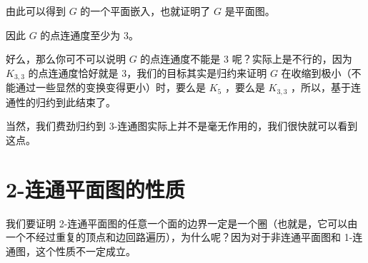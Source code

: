 \documentclass[11pt, a4paper]{ctexart}
\begin{document}
由此可以得到 $G$ 的一个平面嵌入，也就证明了 $G$ 是平面图。

因此 $G$ 的点连通度至少为 3。

好么，那么你可不可以说明 $G$ 的点连通度不能是 3 呢？实际上是不行的，因为 $K_{3,3}$ 的点连通度恰好就是 3，我们的目标其实是归约来证明 $G$ 在收缩到极小（不能通过一些显然的变换变得更小）时，要么是 $K_5$ ，要么是 $K_{3,3}$ ，所以，基于连通性的归约到此结束了。

当然，我们费劲归约到 3-连通图实际上并不是毫无作用的，我们很快就可以看到这点。

\section{2-连通平面图的性质}

我们要证明 2-连通平面图的任意一个面的边界一定是一个圈（也就是，它可以由一个不经过重复的顶点和边回路遍历），为什么呢？因为对于非连通平面图和 1-连通图，这个性质不一定成立。
\end{document}
